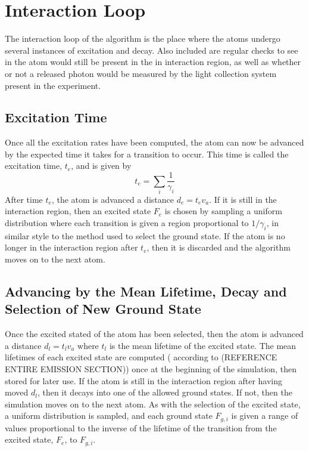 \section{Interaction Loop}
The interaction loop of the algorithm is the place where the atoms undergo several instances of excitation and decay. Also included are regular checks to see in the atom would still be present in the in interaction region, as well as whether or not a released photon would be measured by the light collection system present in the experiment.

\subsection{Excitation Time}
Once all the excitation rates have been computed, the atom can now be advanced by the expected time it takes for a transition to occur. This time is called the excitation time, $t_e$, and is given by
\begin{equation}
t_e = \sum_i \frac{1}{\gamma_i}
\end{equation}
After time $t_e$, the atom is advanced a distance $d_e = t_ev_a$. If it is still in the interaction region, then an excited state $F_e$ is chosen by sampling a uniform distribution where each transition is given a region proportional to $1/\gamma_i$, in similar style to the method used to select the ground state. If the atom is no longer in the interaction region after $t_e$, then it is discarded and the algorithm moves on to the next atom.

\subsection{Advancing by the Mean Lifetime, Decay and Selection of New Ground State}
Once the excited stated of the atom has been selected, then the atom is advanced a distance $d_l = t_lv_a$ where $t_l$ is the mean lifetime of the excited state. The mean lifetimes of each excited state are computed ( according to (REFERENCE ENTIRE EMISSION SECTION)) once at the beginning of the simulation, then stored for later use. If the atom is still in the interaction region after having moved $d_l$, then it decays into one of the allowed ground states. If not, then the simulation moves on to the next atom. As with the selection of the excited state, a uniform distribution is sampled, and each ground state $F_{g,i}$ is given a range of values proportional to the inverse of the lifetime of the transition from the excited state, $F_{e}$, to $F_{g,i}$. 

